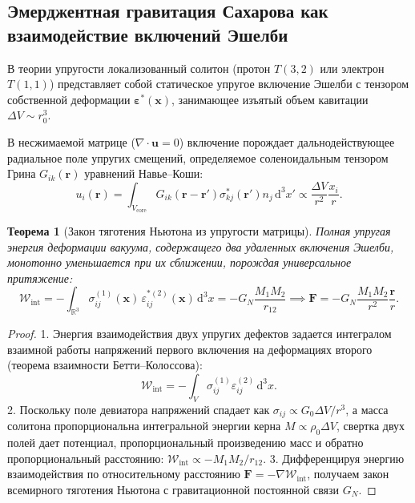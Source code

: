 \documentclass[11pt,a4paper]{article}
\newtheorem{theorem}{Теорема}[section]
\theoremstyle{definition}
\theoremstyle{remark}
\begin{document}
\subsection{Эмерджентная гравитация Сахарова как взаимодействие включений Эшелби}
В теории упругости локализованный солитон (протон $T(3,2)$ или электрон $T(1,1)$) представляет собой статическое упругое включение Эшелби с тензором собственной деформации $\boldsymbol{\varepsilon}^*(\mathbf{x})$, занимающее изъятый объем кавитации $\Delta V \sim r_0^3$.

В несжимаемой матрице ($\nabla \cdot \mathbf{u} = 0$) включение порождает дальнодействующее радиальное поле упругих смещений, определяемое соленоидальным тензором Грина $G_{ik}(\mathbf{r})$ уравнений Навье--Коши:
\begin{equation}
    u_i(\mathbf{r}) = \int_{V_{\mathrm{core}}} G_{ik}(\mathbf{r} - \mathbf{r}') \sigma_{kj}^*(\mathbf{r}') n_j \, \mathrm{d}^3 x' \propto \frac{\Delta V}{r^2} \frac{x_i}{r}.
\end{equation}

\begin{theorem}[Закон тяготения Ньютона из упругости матрицы]
Полная упругая энергия деформации вакуума, содержащего два удаленных включения Эшелби, монотонно уменьшается при их сближении, порождая универсальное притяжение:
\begin{equation}
    \mathcal{W}_{\mathrm{int}} = -\int_{\mathbb{R}^3} \sigma_{ij}^{(1)}(\mathbf{x}) \, \varepsilon_{ij}^{*(2)}(\mathbf{x}) \, \mathrm{d}^3 x = - G_N \frac{M_1 M_2}{r_{12}} \implies \mathbf{F} = - G_N \frac{M_1 M_2}{r^2} \frac{\mathbf{r}}{r}.
    \label{eq:newton_law_derived}
\end{equation}
\end{theorem}

\begin{proof}
1. Энергия взаимодействия двух упругих дефектов задается интегралом взаимной работы напряжений первого включения на деформациях второго (теорема взаимности Бетти--Колоссова):
\begin{equation}
    \mathcal{W}_{\mathrm{int}} = -\int_V \sigma_{ij}^{(1)} \varepsilon_{ij}^{(2)} \, \mathrm{d}^3 x.
\end{equation}
2. Поскольку поле девиатора напряжений спадает как $\sigma_{ij} \propto G_0 \Delta V / r^3$, а масса солитона пропорциональна интегральной энергии керна $M \propto \rho_0 \Delta V$, свертка двух полей дает потенциал, пропорциональный произведению масс и обратно пропорциональный расстоянию: $\mathcal{W}_{\mathrm{int}} \propto - M_1 M_2 / r_{12}$.
3. Дифференцируя энергию взаимодействия по относительному расстоянию $\mathbf{F} = -\nabla \mathcal{W}_{\mathrm{int}}$, получаем закон всемирного тяготения Ньютона с гравитационной постоянной связи $G_N$.
\end{proof}
\end{document}
